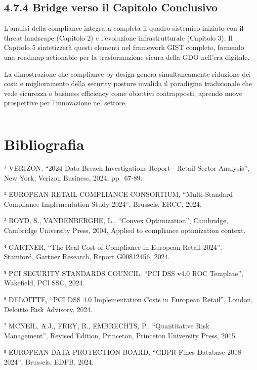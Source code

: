 \documentclass[12pt,a4paper,oneside]{book}
\numberwithin{figure}{chapter} %
\numberwithin{table}{chapter}  %
\begin{document}
\subsection{4.7.4 Bridge verso il Capitolo
Conclusivo}\label{bridge-verso-il-capitolo-conclusivo}

L'analisi della compliance integrata completa il quadro sistemico
iniziato con il threat landscape (Capitolo 2) e l'evoluzione
infrastrutturale (Capitolo 3). Il Capitolo 5 sintetizzerà questi
elementi nel framework GIST completo, fornendo una roadmap actionable
per la trasformazione sicura della GDO nell'era digitale.

La dimostrazione che compliance-by-design genera simultaneamente
riduzione dei costi e miglioramento della security posture invalida il
paradigma tradizionale che vede sicurezza e business efficiency come
obiettivi contrapposti, aprendo nuove prospettive per l'innovazione nel
settore.

\begin{center}\rule{0.5\linewidth}{0.5pt}\end{center}

\section{Bibliografia}\label{bibliografia-1}

¹ VERIZON, ``2024 Data Breach Investigations Report - Retail Sector
Analysis'', New York, Verizon Business, 2024, pp.~67-89.

² EUROPEAN RETAIL COMPLIANCE CONSORTIUM, ``Multi-Standard Compliance
Implementation Study 2024'', Brussels, ERCC, 2024.

³ BOYD, S., VANDENBERGHE, L., ``Convex Optimization'', Cambridge,
Cambridge University Press, 2004, Applied to compliance optimization
context.

⁴ GARTNER, ``The Real Cost of Compliance in European Retail 2024'',
Stamford, Gartner Research, Report G00812456, 2024.

⁵ PCI SECURITY STANDARDS COUNCIL, ``PCI DSS v4.0 ROC Template'',
Wakefield, PCI SSC, 2024.

⁶ DELOITTE, ``PCI DSS 4.0 Implementation Costs in European Retail'',
London, Deloitte Risk Advisory, 2024.

⁷ MCNEIL, A.J., FREY, R., EMBRECHTS, P., ``Quantitative Risk
Management'', Revised Edition, Princeton, Princeton University Press,
2015.

⁸ EUROPEAN DATA PROTECTION BOARD, ``GDPR Fines Database 2018-2024'',
Brussels, EDPB, 2024.
\end{document}
